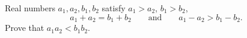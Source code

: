 Real numbers $a_1,a_2,b_1,b_2$ satisfy $a_1>a_2$, $b_1>b_2$,
\[
a_1+a_2=b_1+b_2\qquad\text{and}\qquad a_1-a_2>b_1-b_2 .
\]
Prove that $a_1a_2<b_1b_2$.
